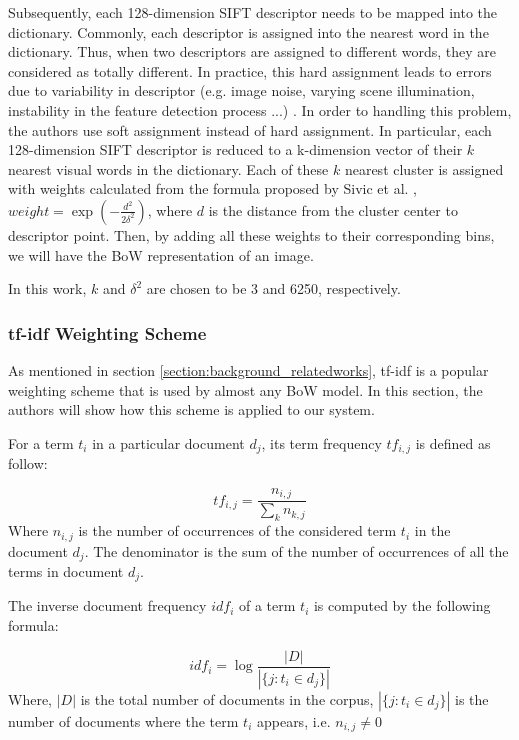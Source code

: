 Subsequently, each 128-dimension SIFT descriptor needs to be mapped into the dictionary. Commonly, each descriptor is assigned into the nearest word in the dictionary. Thus, when two descriptors are assigned to different words, they are considered as totally different. In practice, this hard assignment leads to errors due to variability in descriptor (e.g. image noise, varying scene illumination, instability in the feature detection process ...) \cite{7}. In order to handling this problem, the authors use soft assignment instead of hard assignment. In particular, each 128-dimension SIFT descriptor is reduced to a k-dimension vector of their $k$ nearest visual words in the dictionary. Each of these $k$ nearest cluster is assigned with weights calculated from the formula proposed by Sivic et al. \cite{7}, $weight = \exp(-\frac{d^2}{2\delta^2})$, where $d$ is the distance from the cluster center to descriptor point. Then, by adding all these weights to their corresponding bins, we will have the BoW representation of an image.

In this work, $k$ and $\delta^2$ are chosen to be 3 and 6250, respectively.

\subsubsection{tf-idf Weighting Scheme} \label{section:tfidf_weighting}

As mentioned in section \ref{section:background_relatedworks}, tf-idf is a popular weighting scheme that is used by almost any BoW model. In this section, the authors will show how this scheme is applied to our system.

For a term $t_{i}$ in a particular document $d_{j}$, its term frequency $tf_{i, j}$ is defined as follow:

\begin{equation} 
        tf_{i, j} = \frac{n_{i, j}}{\sum\limits_{k} n_{k, j}}
\end{equation}
Where $n_{i, j}$ is the number of occurrences of the considered term $t_{i}$ in the document $d_{j}$. The denominator is the sum of the number of occurrences of all the terms in document $d_{j}$.

The inverse document frequency $idf_{i}$ of a term $t_{i}$ is computed by the following formula:

\begin{equation}
        idf_{i} = \log{\frac{\left|D\right|}{\left|\{j: t_{i} \in d_{j}\}\right|}}
\end{equation}
Where, $\left|D\right|$ is the total number of documents in the corpus, $\left|\{j: t_{i} \in d_{j}\}\right|$ is the number of documents where the term $t_{i}$ appears, i.e. $n_{i, j} \ne 0$

